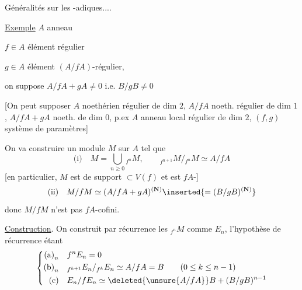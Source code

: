 Généralités sur les
 -adiques....

\uline{Exemple} \quad $A$ anneau 

$f\in A$ élément régulier

$g\in A$ élément $(A/fA)$-régulier, \unsure{\&}

on suppose $A/fA+gA\ne0$ i.e. $B/gB\ne0$

[On peut supposer $A$ noethérien régulier de dim $2$,
$A/fA$ noeth. régulier de dim $1$,
$A/fA+gA$ noeth.  de dim $0$,
p.ex $A$ anneau local régulier de dim $2$,
$(f,g)$ système de paramètres]

On va construire un module $M$ sur $A$ tel que
\[
\text{(i)}\quad M=\bigcup_{n\geq0}{}_{f^n}M,\qquad
{}_{f^{n+1}}M/{}_{f^n}M\simeq A/fA
\]
[en particulier, $M$ est de support $\subset V(f)$ et est
$fA$-]
\[
\text{(ii)}\quad M/fM\simeq(A/fA+gA)^{(\mathbf{N})}\inserted{=(B/gB)^{(\mathbf{N})}}
\]
donc $M/fM$ n'est pas $fA$-cofini.

\uline{Construction}. On construit par récurrence les
${}_{f^n}M$ comme $E_n$, l'hypothèse de
récurrence étant
\[
\left\{\begin{aligned}
\text{(a)}_n\quad & f^nE_n=0\\
\text{(b)}_n\quad & {}_{f^{k+1}}E_n/{}_{f^k}E_n\simeq A/fA=B\qquad(0\leq k\leq n-1)\\
\text{(c)}\quad & E_n/fE_n\simeq\deleted{\unsure{A/fA}}B+(B/gB)^{n-1}
\end{aligned}\right.
\]

